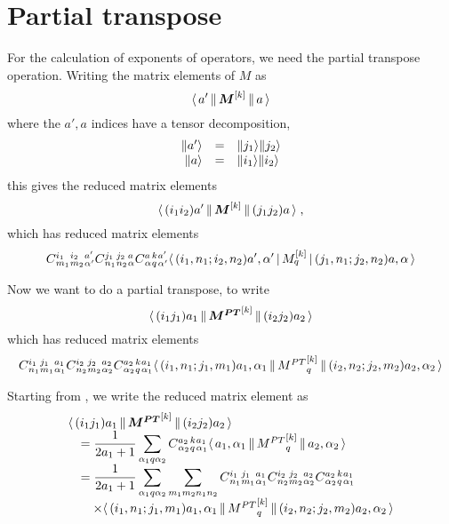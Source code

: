 \documentclass{article}[10pt]
\begin{document}
\section{Partial transpose}


For the calculation of exponents of operators, we need the partial transpose operation. Writing
the matrix elements of $M$ as
\begin{equation}
\rbigbraket{a'}{\itensor{M}{k}}{a}
\end{equation}
where the $a',a$ indices have a tensor decomposition,
\begin{equation}
\begin{array}{rcl}
\rket{a'} &=& \rket{j_1} \rket{j_2} \\
\rket{a} &=& \rket{i_1} \rket{i_2}
\end{array}
\end{equation}
this gives the reduced matrix elements
\begin{equation}
\rbigbraket{(i_1 i_2) a'}{\itensor{M}{k}}{(j_1 j_2) a} \; ,
\end{equation}
which has reduced matrix elements
\begin{equation}
\qcg{i_1}{i_2}{a'}{m_1}{m_2}{\alpha'}
\qcg{j_1}{j_2}{a}{n_1}{n_2}{\alpha}
\qcg{a}{k}{a'}{\alpha}{q}{\alpha'}
\bigbraket{(i_1, n_1 ; i_2, n_2) a',\alpha'}{\itensorcomp{M}{k}{q}}{(j_1,n_1;j_2,n_2) a,\alpha}
\end{equation}

Now we want to do a partial transpose, to write
\begin{equation}
\rbigbraket{(i_1 j_1) a_1}{\itensor{M^{PT}}{k}}{(i_2 j_2) a_2}
\label{eq:TransposedRME}
\end{equation}
which has reduced matrix elements
\begin{equation}
\qcg{i_1}{j_1}{a_1}{n_1}{m_1}{\alpha_1}
\qcg{i_2}{j_2}{a_2}{n_2}{m_2}{\alpha_2}
\qcg{a_2}{k}{a_1}{\alpha_2}{q}{\alpha_1}
\rbigbraket{(i_1,n_1; j_1,m_1) a_1,\alpha_1}{\itensorcomp{M^{PT}}{k}{q}}{(i_2,n_2; j_2,m_2) a_2,\alpha_2}
\end{equation}

Starting from , we write the reduced matrix element as
\begin{equation}
\begin{array}{l}
\displaystyle
\rbigbraket{(i_1 j_1) a_1}{\itensor{M^{PT}}{k}}{(i_2 j_2) a_2} \\ \quad \displaystyle
= \frac{1}{2a_1+1} \sum_{\alpha_1 q \alpha_2} \qcg{a_2}{k}{a_1}{\alpha_2}{q}{\alpha_1}
\rbigbraket{a_1,\alpha_1}{\itensorcomp{M^{PT}}{k}{q}}{a_2,\alpha_2} \\ \quad \displaystyle
= \frac{1}{2a_1+1} \sum_{\alpha_1 q \alpha_2} \sum_{m_1 m_2 n_1 n_2}
\qcg{i_1}{j_1}{a_1}{n_1}{m_1}{\alpha_1}
\qcg{i_2}{j_2}{a_2}{n_2}{m_2}{\alpha_2}
\qcg{a_2}{k}{a_1}{\alpha_2}{q}{\alpha_1}
\\ \quad \quad \displaystyle \times
\rbigbraket{(i_1,n_1; j_1,m_1) a_1,\alpha_1}{\itensorcomp{M^{PT}}{k}{q}}{(i_2,n_2; j_2,m_2) a_2,\alpha_2}
\\
\end{array}
\end{equation}
\end{document}
